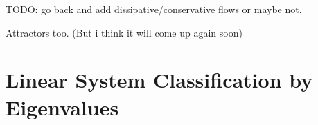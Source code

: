 TODO: go back and add dissipative/conservative flows or maybe not. 

Attractors too. (But i think it will come up again soon)

\section*{Linear System Classification by Eigenvalues}

 









